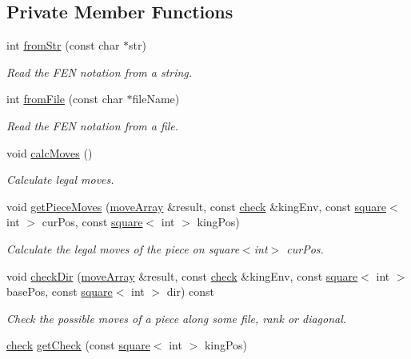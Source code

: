 \subsection*{Private Member Functions}
\begin{DoxyCompactItemize}
\item 
int \hyperlink{classBoard_a49045c77d568e4b5a00f176a2add54c8}{from\+Str} (const char $\ast$str)
\begin{DoxyCompactList}\small\item\em Read the F\+EN notation from a string. \end{DoxyCompactList}\item 
int \hyperlink{classBoard_a4043087fc35e9706d0e83ec07225fe33}{from\+File} (const char $\ast$file\+Name)
\begin{DoxyCompactList}\small\item\em Read the F\+EN notation from a file. \end{DoxyCompactList}\item 
void \hyperlink{classBoard_ad4d3ebb2342b74d9455a89924a54aa14}{calc\+Moves} ()
\begin{DoxyCompactList}\small\item\em Calculate legal moves. \end{DoxyCompactList}\item 
void \hyperlink{classBoard_aa70526dde51ab18ec4011c07a7e38e60}{get\+Piece\+Moves} (\hyperlink{structmoveArray}{move\+Array} \&result, const \hyperlink{structcheck}{check} \&king\+Env, const \hyperlink{structsquare}{square}$<$ int $>$ cur\+Pos, const \hyperlink{structsquare}{square}$<$ int $>$ king\+Pos)
\begin{DoxyCompactList}\small\item\em Calculate the legal moves of the piece on square$<$int$>$ cur\+Pos. \end{DoxyCompactList}\item 
void \hyperlink{classBoard_af75103b55ce8129ffad6bc721162daa4}{check\+Dir} (\hyperlink{structmoveArray}{move\+Array} \&result, const \hyperlink{structcheck}{check} \&king\+Env, const \hyperlink{structsquare}{square}$<$ int $>$ base\+Pos, const \hyperlink{structsquare}{square}$<$ int $>$ dir) const 
\begin{DoxyCompactList}\small\item\em Check the possible moves of a piece along some file, rank or diagonal. \end{DoxyCompactList}\item 
\hyperlink{structcheck}{check} \hyperlink{classBoard_afc291baf2c205a64255e8e55ffeff004}{get\+Check} (const \hyperlink{structsquare}{square}$<$ int $>$ king\+Pos)

\end{DoxyCompactItemize}
